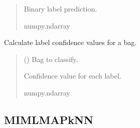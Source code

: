 \documentclass[letterpaper,10pt,english]{sphinxmanual}
\begin{document}
\begin{fulllineitems}
\begin{fulllineitems}
\begin{quote}
\begin{description}
\sphinxAtStartPar
Binary label prediction.

\sphinxAtStartPar
numpy.ndarray

\end{description}\end{quote}

\end{fulllineitems}


\begin{fulllineitems}
\label{\detokenize{classifier/lazy/index:miml.classifier.miml.lazy.miml_dgc.MIMLDGC.predict_proba_bag}}
\pysigstartsignatures
\pysiglinewithargsret
{}
{}
{}
\pysigstopsignatures
\sphinxAtStartPar
Calculate label confidence values for a bag.
\begin{quote}\begin{description}
\sphinxAtStartPar
{} ({\hyperref[\detokenize{data/_autosummary/miml.data.bag.Bag:miml.data.bag.Bag}]{}}) \textendash{} Bag to classify.

\sphinxAtStartPar
Confidence value for each label.

\sphinxAtStartPar
numpy.ndarray

\end{description}\end{quote}

\end{fulllineitems}


\end{fulllineitems}



\subsection{MIML\sphinxhyphen{}MAP\sphinxhyphen{}kNN}
\label{\detokenize{classifier/lazy/index:miml-map-knn}}
\end{document}
